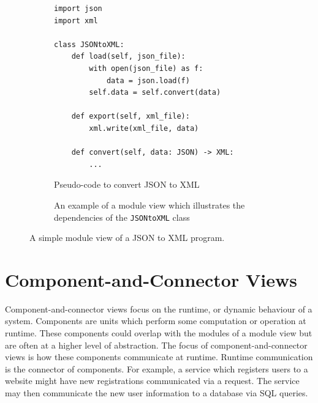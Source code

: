 \begin{figure}[ht]
\centering
\begin{subfigure}[b]{\textwidth}
\begin{shaded}
\begin{lstlisting}[style=python]
import json
import xml

class JSONtoXML:
    def load(self, json_file):
        with open(json_file) as f:
            data = json.load(f)
        self.data = self.convert(data)

    def export(self, xml_file):
        xml.write(xml_file, data)

    def convert(self, data: JSON) -> XML:
        ...
\end{lstlisting}
\end{shaded}
\caption{Pseudo-code to convert JSON to XML}
\end{subfigure}


\begin{subfigure}[b]{\textwidth}
\begin{center}
\end{center}
\caption{An example of a module view which illustrates the dependencies of the \texttt{JSONtoXML} class}
\end{subfigure}
\caption{A simple module view of a JSON to XML program.}
\end{figure}

\section{Component-and-Connector Views}
Component-and-connector views focus on the runtime, or dynamic behaviour of a system.
Components are units which perform some computation or operation at runtime.
These components could overlap with the modules of a module view but are often at a higher level of abstraction.
The focus of component-and-connector views is how these components communicate at runtime.
Runtime communication is the connector of components.
For example, a service which registers users to a website might have new registrations communicated via a  request.
The service may then communicate the new user information to a database via SQL queries.

